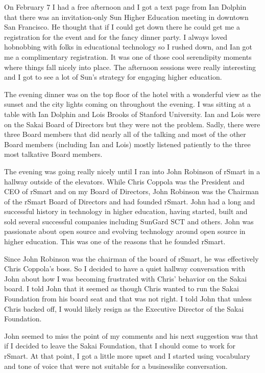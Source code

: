 \documentclass[12pt]{book}
\begin{document}
On February 7 I had a free afternoon and I got a text page from Ian Dolphin that
there was an invitation-only Sun Higher Education meeting in downtown San
Francisco.  He thought that if I could get down there he could get me a
registration for the event and for the fancy dinner party.   I always loved
hobnobbing with folks in educational technology so I rushed down, and
Ian got me a complimentary registration.   It was one of those cool
serendipity moments where things fall nicely into place.
The afternoon sessions were really interesting
and I got to see a lot of Sun's strategy for engaging higher education.

The evening dinner was on the top floor of the hotel with a wonderful view
as the sunset and the city lights coming on throughout the evening.   I was
sitting at a table with Ian Dolphin and Lois Brooks of Stanford University.
Ian and Lois were on the Sakai Board of Directors but they were not the problem.
Sadly, there were three Board members that did nearly all of the talking and
most of the other Board members (including Ian and Lois) mostly listened
patiently to the three most talkative Board members.

The evening was going really nicely until I ran into John Robinson of rSmart
in a hallway outside of the elevators.  While Chris Coppola was the
President and CEO of rSmart and on my Board of Directors, John Robinson
was the Chairman of the rSmart Board of Directors and had founded rSmart.
John had a long and successful history
in technology in higher education, having started, built and sold several
successful companies including SunGard SCT and others.   John was
passionate about open source and evolving technology around open source in
higher education.   This was one of the reasons that he founded rSmart.

Since John Robinson was the chairman of the board of rSmart, he was effectively
Chris Coppola's boss.   So I decided to have a quiet hallway conversation with
John about how I was becoming frustrated with Chris' behavior on the Sakai board.
I told John that it seemed as though Chris wanted to run the Sakai Foundation
from his board seat and that was not right.  I told John that unless Chris backed
off, I would likely resign as the Executive Director of the Sakai Foundation.

John seemed to miss the point of my comments and his next suggestion was that if
I decided to leave the Sakai Foundation, that I should come to work for rSmart.
At that point, I got a little more upset and I started using vocabulary and tone of voice that were
not suitable for a businesslike conversation.
\end{document}
